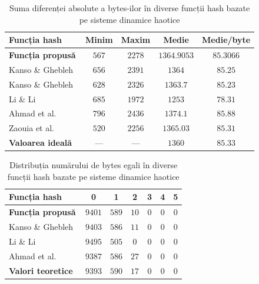 \begin{table}[!htbp]
    \centering
    \begin{tabular}{|l|c|c|c|c|}
        \hline
        \textbf{Funcția hash} & \textbf{Minim} & \textbf{Maxim} & \textbf{Medie} & \textbf{Medie/byte} \\
        \hline
        \textbf{Funcția propusă} & $567$ & $2278$ & $1364.9053$ & $85.3066$ \\
        \hline
        Kanso \& Ghebleh~\cite{kanso2013} & $656$ & $2391$ & $1364$ & $85.25$ \\
        \hline
        Kanso \& Ghebleh~\cite{kanso2015} & $628$ & $2326$ & $1363.7$ & $85.23$ \\
        \hline
        Li \& Li~\cite{li2016} & $685$ & $1972$ & $1253$ & $78.31$ \\
        \hline
        Ahmad et al.~\cite{ahmad2017} & $796$ & $2436$ & $1374.1$ & $85.88$ \\
        \hline
        Zaouia et al.~\cite{zaouia2023} & $520$ & $2256$ & $1365.03$ & $85.31$ \\
        \hline
        \textbf{Valoarea ideală} & --- & --- & $1360$ & $85.33$ \\
        \hline
    \end{tabular}
    \caption{Suma diferenței absolute a bytes-ilor în diverse funcții hash bazate pe sisteme dinamice haotice}
    \label{tab:comparatie-coliziuni}
\end{table}

\begin{table}[!htbp]
    \centering
    \begin{tabular}{|l|c|c|c|c|c|c|}
        \hline
        \textbf{Funcția hash} & \textbf{0} & \textbf{1} & \textbf{2} & \textbf{3} & \textbf{4} & \textbf{5} \\
        \hline
        \textbf{Funcția propusă} & $9401$ & $589$ & $10$ & $0$ & $0$ & $0$ \\
        \hline
        Kanso \& Ghebleh~\cite{kanso2015} & $9403$ & $586$ & $11$ & $0$ & $0$ & $0$ \\
        \hline
        Li \& Li~\cite{li2016} & $9495$ & $505$ & $0$ & $0$ & $0$ & $0$ \\
        \hline
        Ahmad et al.~\cite{ahmad2017} & $9387$ & $586$ & $27$ & $0$ & $0$ & $0$ \\
        \hline
        \textbf{Valori teoretice} & $9393$ & $590$ & $17$ & $0$ & $0$ & $0$ \\
        \hline
    \end{tabular}
    \caption{Distribuția numărului de bytes egali în diverse funcții hash bazate pe sisteme dinamice haotice}
    \label{tab:comparatie-coliziuni-bytes}
\end{table}

